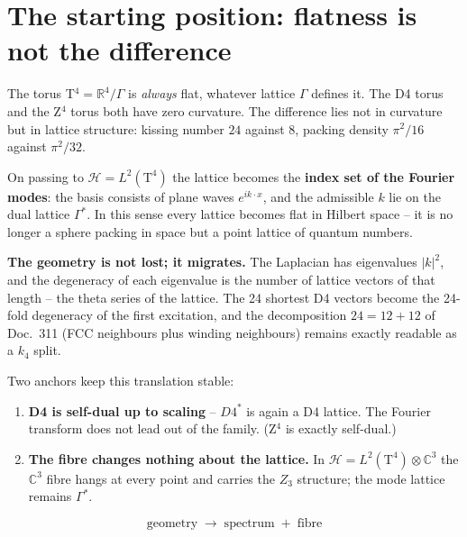 \documentclass[11pt]{report}
\begin{document}
\chapter{The starting position: flatness is not the difference}

The torus T$^4 = \mathbb{R}^4/\Gamma$ is \emph{always} flat,
whatever lattice $\Gamma$ defines it. The D4 torus and the Z$^4$
torus both have zero curvature. The difference lies not in curvature
but in lattice structure: kissing number $24$ against $8$, packing
density $\pi^2/16$ against $\pi^2/32$.

On passing to $\mathcal{H} = L^2(\text{T}^4)$ the lattice becomes
the \textbf{index set of the Fourier modes}: the basis consists of
plane waves $e^{ik\cdot x}$, and the admissible $k$ lie on the dual
lattice $\Gamma^{*}$. In this sense every lattice becomes flat in
Hilbert space -- it is no longer a sphere packing in space but a
point lattice of quantum numbers.

\textbf{The geometry is not lost; it migrates.} The Laplacian has
eigenvalues $|k|^2$, and the degeneracy of each eigenvalue is the
number of lattice vectors of that length -- the theta series of the
lattice. The 24 shortest D4 vectors become the 24-fold degeneracy of
the first excitation, and the decomposition $24 = 12+12$ of Doc.~311
(FCC neighbours plus winding neighbours) remains exactly readable as
a $k_4$ split.

Two anchors keep this translation stable:

\begin{enumerate}
  \item \textbf{D4 is self-dual up to scaling} -- $D4^{*}$ is again a
        D4 lattice. The Fourier transform does not lead out of the
        family. (Z$^4$ is exactly self-dual.)
  \item \textbf{The fibre changes nothing about the lattice.} In
        $\mathcal{H} = L^2(\text{T}^4)\otimes\mathbb{C}^3$ the
        $\mathbb{C}^3$ fibre hangs at every point and carries the
        $Z_3$ structure; the mode lattice remains $\Gamma^{*}$.
\end{enumerate}

\begin{equation}
  \boxed{\;\text{geometry}\;\longrightarrow\;
  \text{spectrum}\;+\;\text{fibre}\;}
\end{equation}

\end{document}
